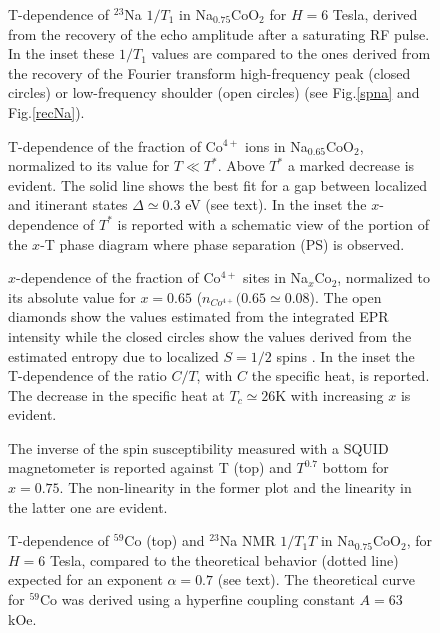 \documentclass[prb,showpacs,preprintnumbers,amsmath,amssymb,floatfix]{revtex4}
\begin{document}
\begin{figure}
 \caption{T-dependence
of $^{23}$Na $1/T_1$ in Na$_{0.75}$CoO$_2$ for $H= 6$ Tesla,
derived from the recovery of the echo amplitude after a saturating
RF pulse. In the inset these $1/T_1$ values are compared to the
ones derived from the recovery of the Fourier transform
high-frequency peak (closed circles) or low-frequency shoulder
(open circles) (see Fig.\ref{spna} and Fig.\ref{recNa}). }
\label{T1Na}
\end{figure}

\begin{figure}
 \caption{T-dependence
of the fraction of Co$^{4+}$ ions in Na$_{0.65}$CoO$_2$,
normalized to its value for $T\ll T^*$. Above $T^*$ a marked
decrease is evident. The solid line shows the best fit for a gap
between localized and itinerant states $\Delta\simeq 0.3$ eV (see
text). In the inset the $x$-dependence of $T^*$ is reported with a
schematic view of the portion of the $x$-T phase diagram where
phase separation (PS) is observed.} \label{fracCo}
\end{figure}

\begin{figure}
 \caption{$x$-dependence
of the fraction of Co$^{4+}$ sites in Na$_x$Co$_2$, normalized to
its absolute value for $x=0.65$ ($n_{Co^{4+}}(0.65\simeq 0.08$).
The open diamonds show the values estimated from the integrated
EPR intensity while the closed circles show the values derived
from the estimated entropy due to localized $S=1/2$ spins
\cite{Feher}. In the inset the T-dependence of the ratio $C/T$,
with $C$ the specific heat, is reported. The decrease in the
specific heat at $T_c\simeq 26$K with increasing $x$ is evident.}
\label{entropy}
\end{figure}

\begin{figure}
\caption{The inverse of the spin susceptibility measured with a
SQUID magnetometer is reported against T (top) and $T^{0.7}$
bottom for $x=0.75$. The non-linearity in the former plot and the
linearity in the latter one are evident.} \label{chialpa}
\end{figure}


\begin{figure}
\caption{T-dependence of $^{59}$Co (top) and $^{23}$Na NMR
$1/T_1T$ in Na$_{0.75}$CoO$_2$, for $H= 6$ Tesla, compared to the
theoretical behavior (dotted line) expected for an exponent
$\alpha= 0.7$ (see text). The theoretical curve for $^{59}$Co was
derived using a hyperfine coupling constant $A=63$ kOe.}
\label{t1alpa}
\end{figure}
\end{document}
